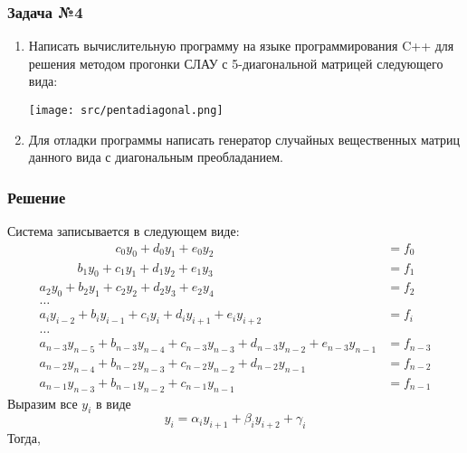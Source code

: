 \documentclass[a4paper, fontsize=14pt]{article}
\begin{document}
\subsubsection*{Задача №4}
\begin{enumerate}
    \item Написать вычислительную программу на языке программирования C++
    для решения методом прогонки СЛАУ с 5-диагональной матрицей
    следующего вида:
    \begin{center}
        \texttt{[image: src/pentadiagonal.png]}
    \end{center}
    \item Для отладки программы написать генератор случайных вещественных
матриц данного вида с диагональным преобладанием.
\end{enumerate}
\subsubsection*{Решение}
Система записывается в следующем виде:
\begin{equation*}
    \begin{aligned}
        \qquad \qquad \qquad c_0y_0+d_0y_1+e_0y_2&=f_0 \\
        \qquad \quad b_1y_0+c_1y_1+d_1y_2+e_1y_3&=f_1 \\
        a_2y_{0}+b_2y_{1}+c_2y_{2}+d_2y_{3}+e_2y_{4}&=f_2\\
        \dots \\
        a_iy_{i-2}+b_iy_{i-1}+c_iy_{i}+d_iy_{i+1}+e_iy_{i+2}&=f_i\\
        \dots \\
        a_{n-3}y_{n-5}+b_{n-3}y_{n-4}+c_{n-3}y_{n-3}+d_{n-3}y_{n-2}+e_{n-3}y_{n-1}&=f_{n-3}\\
        a_{n-2}y_{n-4}+b_{n-2}y_{n-3}+c_{n-2}y_{n-2}+d_{n-2}y_{n-1}&=f_{n-2}\\
        a_{n-1}y_{n-3}+b_{n-1}y_{n-2}+c_{n-1}y_{n-1} &=f_{n-1}
    \end{aligned}
\end{equation*}
Выразим все $y_i$ в виде 
\begin{equation*}
    y_i=\alpha_iy_{i+1}+\beta_iy_{i+2}+\gamma_i
\end{equation*}
Тогда, 
\end{document}
